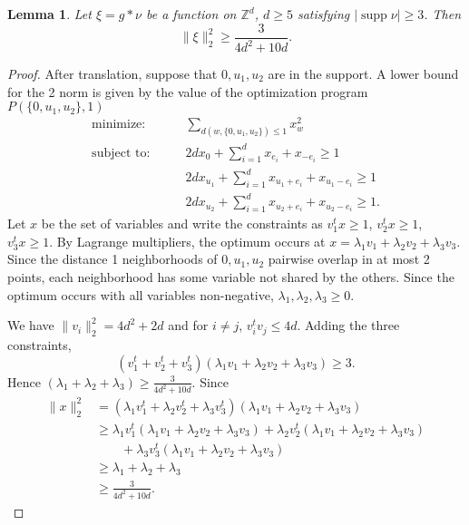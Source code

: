 \documentclass[a4paper, 12pt, notitlepage]{amsart}
\newcommand{\supp}{\operatorname{supp}}
\newcommand{\zed}{\mathbb{Z}}
\newtheorem{lemma}[theorem]{Lemma}
\theoremstyle{remark}
\begin{document}
\begin{lemma}\label{program_lower_bounds_larger}
 Let $\xi = g*\nu$ be a function on $\zed^d$, $d \geq 5$ satisfying $|\supp \nu| \geq 3$.  Then
 \begin{equation}
  \|\xi\|_2^2 \geq \frac{3}{4d^2 + 10 d}.
 \end{equation}
\end{lemma}
\begin{proof}
 After translation, suppose that $0, u_1, u_2$ are in the support.  A lower bound for the 2 norm is given by the value of the optimization program $P(\{0, u_1, u_2\}, 1)$
  \begin{align*}
\text{minimize:} &\qquad  \sum_{d(w, \{0, u_1, u_2\}) \leq 1} x_w^2\\
\text{subject to:} &\qquad 2dx_0 + \sum_{i=1}^d x_{e_i} + x_{-e_i} \geq 1\\ & \qquad 2 dx_{u_1} + \sum_{i=1}^d x_{u_1 + e_i} + x_{u_1 - e_i} \geq 1\\ & \qquad 2 dx_{u_2} + \sum_{i=1}^d x_{u_2 + e_i} + x_{u_2 - e_i}\geq 1.
\end{align*}
Let $x$ be the set of variables and write the constraints as $v_1^t x \geq 1$, $v_2^t  x \geq 1$, $v_3^t x \geq 1$. By Lagrange multipliers, the optimum occurs at $x = \lambda_1 v_1 + \lambda_2 v_2 + \lambda_3 v_3$.  Since the distance 1 neighborhoods of $0, u_1,u_2$ pairwise overlap in at most 2 points, each neighborhood has some variable not shared by the others.  Since the optimum occurs with all variables non-negative, $\lambda_1, \lambda_2, \lambda_3 \geq 0$.  

We have $\|v_i\|_2^2 = 4d^2 + 2d$ and for $i \neq j$, $v_i^t v_j \leq 4d$.  Adding the three constraints, 
\begin{equation}
 (v_1^t + v_2^t + v_3^t)(\lambda_1 v_1 + \lambda_2 v_2 + \lambda_3 v_3) \geq 3.
\end{equation}
Hence $(\lambda_1 + \lambda_2 + \lambda_3) \geq \frac{3}{4d^2 + 10d}.$  Since
\begin{align*}
 \|x\|_2^2 &= \left(\lambda_1 v_1^t + \lambda_2 v_2^t + \lambda_3 v_3^t\right)(\lambda_1 v_1 + \lambda_2 v_2 + \lambda_3 v_3)\\& \geq
 \lambda_1 v_1^t (\lambda_1 v_1 + \lambda_2 v_2 + \lambda_3 v_3) + \lambda_2 v_2^t (\lambda_1 v_1 + \lambda_2 v_2 + \lambda_3 v_3) \\& \qquad+ \lambda_3 v_3^t (\lambda_1 v_1 + \lambda_2 v_2 + \lambda_3 v_3) \\ & \geq \lambda_1 + \lambda_2 + \lambda_3 \\&\geq \frac{3}{4d^2 + 10 d}.
\end{align*}

\end{proof}
\end{document}
